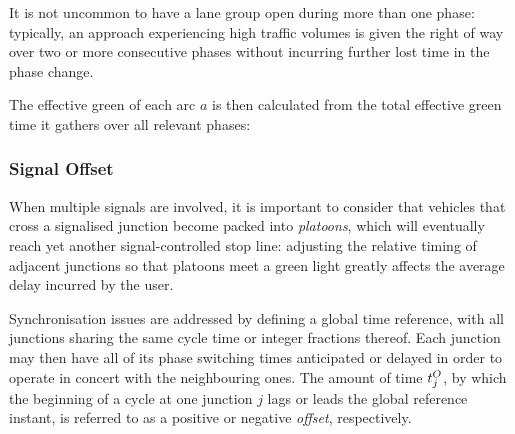 
It is not uncommon to have a lane group open during more than one phase: typically, an
approach experiencing high traffic volumes is given the right of way over two or more
consecutive phases without incurring further lost time in the phase change.

The effective green of each arc $a$ is then calculated from the total effective green time it
gathers over all relevant phases:

\subsubsection{Signal Offset}
When multiple signals are involved, it is important to consider that vehicles that cross a signalised junction become packed into \emph{platoons}, which will eventually reach yet another signal-controlled stop line: adjusting the relative timing of adjacent junctions so that platoons meet a green light greatly affects the average delay incurred by the user. 

Synchronisation issues are addressed by defining a global time reference, with all junctions sharing the same cycle time or integer fractions thereof.
Each junction may then have all of its phase switching times anticipated or delayed in order to operate in concert with the neighbouring ones.
The amount of time $t_{j}^O$, by which the beginning of a cycle at one junction $j$ lags or leads the global reference instant, is referred to as a positive or negative \emph{offset}, respectively.





